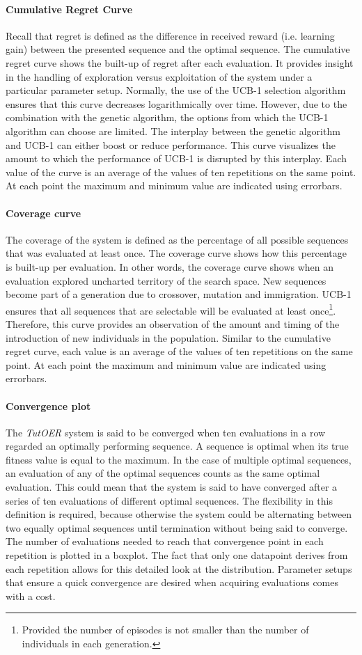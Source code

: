 \paragraph{Cumulative Regret Curve}
Recall that regret is defined as the difference in received reward (i.e.
learning gain) between the presented sequence and the optimal sequence.
The cumulative regret curve shows the built-up of regret after each
evaluation. It provides insight in the handling of exploration versus
exploitation of the system under a particular parameter setup.
Normally, the use of the UCB-1 selection algorithm ensures that
this curve decreases logarithmically over time. However, due to the
combination with the genetic algorithm, the options from which the UCB-1
algorithm can choose are limited. The interplay between the genetic algorithm
and UCB-1 can either boost or reduce performance. This curve visualizes
the amount to which the performance of UCB-1 is disrupted by this interplay.
Each value of the curve is an average of the values of ten repetitions
on the same point. At each point the maximum and minimum value are indicated
using errorbars.
\paragraph{Coverage curve}
The coverage of the system is defined as the percentage of all possible
sequences that was evaluated at least once. The coverage curve shows how this
percentage is built-up per evaluation. In other words, the coverage curve shows
when an evaluation explored uncharted territory of the search space. New
sequences become part of a generation due to crossover, mutation and
immigration. UCB-1 ensures that all sequences that are selectable will be
evaluated at least once\footnote{Provided the number of
episodes is not smaller than the number of individuals in each generation.}.
Therefore, this curve provides an observation of the amount and timing of the
introduction of new individuals in the population. Similar to the cumulative
regret curve, each value is an average of the values of ten repetitions on the
same point. At each point the maximum and minimum value are indicated using
errorbars.
\paragraph{Convergence plot}
The \emph{TutOER} system is said to be converged when ten evaluations in a row
regarded an optimally performing sequence. A sequence is optimal when its true
fitness value is equal to the maximum. In the case of multiple optimal
sequences, an evaluation of any of the optimal sequences counts as the same
optimal evaluation. This could mean that the system is said to have converged
after a series of ten evaluations of different optimal sequences. The
flexibility in this definition is required, because otherwise the system could
be alternating between two equally optimal sequences until termination without
being said to converge. The number of evaluations needed to reach that
convergence point in each repetition is plotted in a boxplot. The fact that
only one datapoint derives from each repetition allows for this detailed look
at the distribution. Parameter setups that ensure a quick convergence are
desired when acquiring evaluations comes with a cost.
